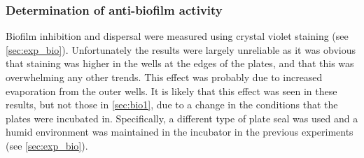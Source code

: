 \subsubsection{Determination of anti-biofilm activity}

Biofilm inhibition and dispersal were measured using crystal violet staining  (see \ref{sec:exp_bio}). Unfortunately the results were largely unreliable as it was obvious that staining was higher in the wells at the edges of the plates, and that this was overwhelming any other trends. This effect was probably due to increased evaporation from the outer wells. 
It is likely that this effect was seen in these results, but not those in \ref{sec:bio1}, due to a change in the conditions that the plates were incubated in. Specifically, a different type of plate seal was used and a humid environment was maintained in the incubator in the previous experiments (see \ref{sec:exp_bio}).